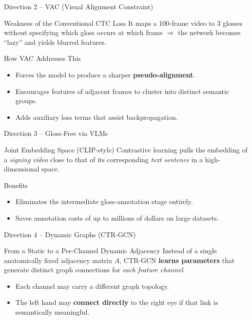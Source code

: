 \documentclass[aspectratio=169]{beamer}
\begin{document}
\begin{frame}{Direction 2 -- VAC (Visual Alignment Constraint)}
    \begin{alertblock}{Weakness of the Conventional CTC Loss}
        It maps a 100-frame video to 3 glosses without specifying which gloss occurs at which frame $\Rightarrow$ the network becomes ``lazy'' and yields blurred features.
    \end{alertblock}
    \vspace{0.3cm}
    \begin{block}{How VAC Addresses This}
        \begin{itemize}
            \item Forces the model to produce a sharper \textbf{pseudo-alignment}.
            \item Encourages features of adjacent frames to cluster into distinct semantic groups.
            \item Adds auxiliary loss terms that assist backpropagation.
        \end{itemize}
    \end{block}
\end{frame}

\begin{frame}{Direction 3 -- Gloss-Free via VLMs}
    \begin{block}{Joint Embedding Space (CLIP-style)}
        Contrastive learning pulls the embedding of a \emph{signing video} close to that of its corresponding \emph{text sentence} in a high-dimensional space.
    \end{block}
    \vspace{0.3cm}
    \begin{exampleblock}{Benefits}
        \begin{itemize}
            \item Eliminates the intermediate gloss-annotation stage entirely.
            \item Saves annotation costs of up to millions of dollars on large datasets.
        \end{itemize}
    \end{exampleblock}
\end{frame}

\begin{frame}{Direction 4 -- Dynamic Graphs (CTR-GCN)}
    \begin{block}{From a Static to a Per-Channel Dynamic Adjacency}
        Instead of a single anatomically fixed adjacency matrix $A$, CTR-GCN \textbf{learns parameters} that generate distinct graph connections for \emph{each feature channel}.
    \end{block}
    \vspace{0.3cm}
    \begin{itemize}
        \item Each channel may carry a different graph topology.
        \item The left hand may \textbf{connect directly} to the right eye if that link is semantically meaningful.
    \end{itemize}
\end{frame}
\end{document}
